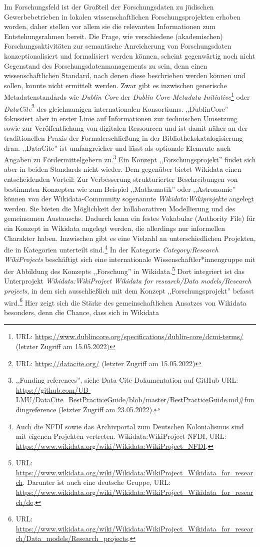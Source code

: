 Im Forschungsfeld ist der Großteil der Forschungsdaten zu jüdischen Gewerbebetrieben in lokalen wissenschaftlichen Forschungsprojekten erhoben worden, daher stellen vor allem sie die relevanten Informationen zum Entstehungsrahmen bereit. Die Frage, wie verschiedene (akademischen) Forschungsaktivitäten zur semantische Anreicherung von Forschungsdaten konzeptionalisiert und formalisiert werden können, scheint gegenwärtig noch nicht Gegenstand des Forschungsdatenmanagements zu sein, denn einen wissenschaftlichen Standard, nach denen diese beschrieben werden können und sollen, konnte nicht ermittelt werden. Zwar gibt es inzwischen generische Metadatenstandards wie \textit{Dublin Core} der \textit{Dublin Core Metadata Initiative}\footnote{URL: \url{https://www.dublincore.org/specifications/dublin-core/dcmi-terms/} (letzter Zugriff am 15.05.2022)} oder \textit{DataCite}\footnote{URL: \url{https://datacite.org/} (letzter Zugriff am 15.05.2022)} des gleichnamigen internationalen Konsortiums. ,,DublinCore'' fokussiert aber in erster Linie auf Informationen zur technischen Umsetzung sowie zur Veröffentlichung von digitalen Ressourcen und ist damit näher an der traditionellen Praxis der Formalerschließung in der Bibliothekskatalogisierung dran. ,,DataCite'' ist umfangreicher und lässt als optionale Elemente auch Angaben zu Fördermittelgebern zu.\footnote{,,Funding references'', siehe Data-Cite-Dokumentation auf GitHub URL: \url{https://github.com/UB-LMU/DataCite\_BestPracticeGuide/blob/master/BestPracticeGuide.md\#fundingreference} (letzter Zugriff am 23.05.2022).} Ein Konzept ,,Forschungsprojekt'' findet sich aber in beiden Standards nicht wieder. Dem gegenüber bietet Wikidata einen entscheidenden Vorteil: Zur Verbesserung strukturierter Beschreibungen von bestimmten Konzepten wie zum Beispiel ,,Mathematik'' oder ,,Astronomie'' können von der Wikidata-Community sogenannte \textit{Wikidata:Wikiprojekte} angelegt werden. Sie bieten die Möglichkeit der kollaborativen Modellierung und des gemeinsamen Austauschs. Dadurch kann ein festes Vokabular (Authority File) für ein Konzept in Wikidata angelegt werden, die allerdings nur informellen Charakter haben. Inzwischen gibt es eine Vielzahl an unterschiedlichen Projekten, die in Kategorien unterteilt sind.\footnote{Auch die NFDI sowie das Archivportal zum Deutschen Kolonialismus sind mit eigenen Projekten vertreten. Wikidata:WikiProject NFDI, URL: \url{https://www.wikidata.org/wiki/Wikidata:WikiProject_NFDI}.} In der Kategorie \textit{Category:Research WikiProjects} beschäftigt sich eine internationale Wissenschaftler*innengruppe mit der Abbildung des Konzepts ,,Forschung'' in Wikidata.\footnote{URL: \url{https://www.wikidata.org/wiki/Wikidata:WikiProject_Wikidata_for_research}. Darunter ist auch eine deutsche Gruppe, URL: \url{https://www.wikidata.org/wiki/Wikidata:WikiProject_Wikidata_for_research/de}.} Dort integriert ist das Unterprojekt \textit{Wikidata:WikiProject Wikidata for research/Data models/Research projects}, in dem sich ausschließlich mit dem Konzept ,,Forschungsprojekt'' befasst wird.\footnote{URL: \url{https://www.wikidata.org/wiki/Wikidata:WikiProject_Wikidata_for_research/Data_models/Research_projects}.} Hier zeigt sich die Stärke des gemeinschaftlichen Ansatzes von Wikidata besonders, denn die Chance, dass sich in Wikidata 